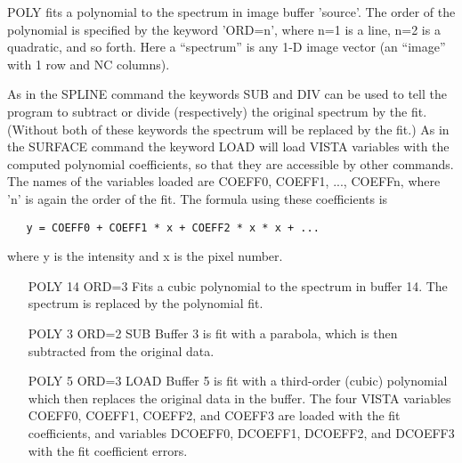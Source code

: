 POLY fits a polynomial to the spectrum in image buffer 'source'.  The order
of the polynomial is specified by the keyword 'ORD=n', where n=1 is a line,
n=2 is a quadratic, and so forth.  Here a ``spectrum'' is any 1-D image
vector (an ``image'' with 1 row and NC columns).

As in the SPLINE command the keywords SUB and DIV can be used to tell the
program to subtract or divide (respectively) the original spectrum by the
fit.  (Without both of these keywords the spectrum will be replaced by the
fit.) As in the SURFACE command the keyword LOAD will load VISTA variables
with the computed polynomial coefficients, so that they are accessible by
other commands.  The names of the variables loaded are COEFF0, COEFF1, ...,
COEFFn, where 'n' is again the order of the fit.  The formula using these
coefficients is
\begin{verbatim}
   y = COEFF0 + COEFF1 * x + COEFF2 * x * x + ...
\end{verbatim}
where y is the intensity and x is the pixel number.

\begin{itemize}
  \item[POLY 14 ORD=3]{Fits a cubic polynomial to the spectrum in buffer
       14.  The spectrum is replaced by the polynomial fit.}

  \item[POLY 3 ORD=2 SUB]{Buffer 3 is fit with a parabola, which is then
       subtracted from the original data.}

  \item[POLY 5 ORD=3 LOAD]{Buffer 5 is fit with a third-order (cubic)
       polynomial which then replaces the original data in the buffer.  The
       four VISTA variables COEFF0, COEFF1, COEFF2, and COEFF3 are loaded
       with the fit coefficients, and variables DCOEFF0, DCOEFF1, DCOEFF2,
       and DCOEFF3 with the fit coefficient errors.}
\end{itemize}


